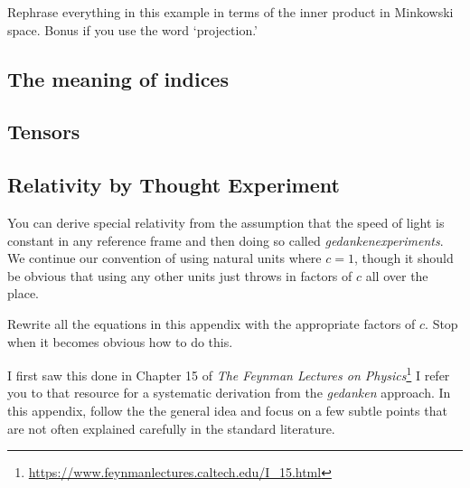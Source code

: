 \documentclass[12pt, oneside]{report}    %
\let\oldsection\section
\def\section{%
  \setcounter{sidenote}{1}%
  \oldsection
}
\begin{document}
\begin{exercise}
Rephrase everything in this example in terms of the inner product in Minkowski space. Bonus if you use the word `projection.'
\end{exercise}

\subsection{The meaning of indices}


\subsection{Tensors}



\begin{subappendices}

\section{Relativity by Thought Experiment}\label{sec:subappendix:relativity}
You can derive special relativity from the assumption that the speed of light is constant in any reference frame and then doing so called \emph{gedankenexperiments}. We continue our convention of using natural units where $c=1$, though it should be obvious that using any other units just throws in factors of $c$ all over the place.
\begin{exercise}
Rewrite all the equations in this appendix with the appropriate factors of $c$. Stop when it becomes obvious how to do this. 
\end{exercise}
I first saw this done in Chapter 15 of \emph{The Feynman Lectures on Physics}\footnote{\url{https://www.feynmanlectures.caltech.edu/I_15.html}} I refer you to that resource for a systematic derivation from the \emph{gedanken} approach. In this appendix, follow the the general idea and focus on a few subtle points that are not often explained carefully in the standard literature.


\end{subappendices}
\end{document}
